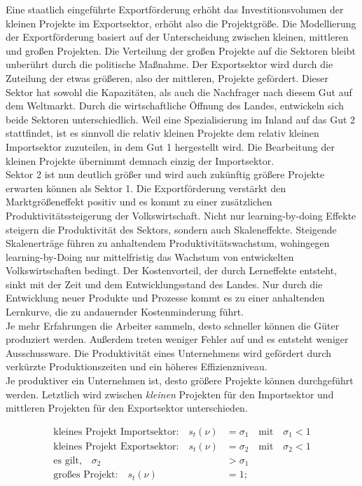 Eine staatlich eingeführte Exportförderung erhöht das Investitionsvolumen der kleinen Projekte im Exportsektor, erhöht also die Projektgröße. Die Modellierung der Exportförderung basiert auf der Unterscheidung zwischen kleinen, mittleren und großen Projekten. Die Verteilung der großen Projekte auf die Sektoren bleibt unberührt durch die politische Maßnahme. Der Exportsektor wird durch die Zuteilung der etwas größeren, also der mittleren, Projekte gefördert.  
Dieser Sektor hat sowohl die Kapazitäten, als auch die Nachfrager nach diesem Gut auf dem Weltmarkt. Durch die wirtschaftliche Öffnung des Landes, entwickeln sich beide Sektoren unterschiedlich. Weil eine Spezialisierung im Inland auf das Gut 2 stattfindet, ist es sinnvoll die relativ kleinen Projekte dem relativ kleinen Importsektor zuzuteilen, in dem Gut 1 hergestellt wird. Die Bearbeitung der kleinen Projekte übernimmt demnach einzig der Importsektor.\\
Sektor 2 ist nun deutlich größer und wird auch zukünftig größere Projekte erwarten können als Sektor 1. Die Exportförderung verstärkt den Marktgrößeneffekt positiv und es kommt zu einer zusätzlichen Produktivitätssteigerung der Volkswirtschaft.  Nicht nur learning-by-doing Effekte steigern die Produktivität des Sektors, sondern auch Skaleneffekte. Steigende Skalenerträge führen zu anhaltendem Produktivitätswachstum, wohingegen learning-by-Doing nur mittelfristig das Wachstum von entwickelten Volkswirtschaften bedingt. Der Kostenvorteil, der durch Lerneffekte entsteht, sinkt mit der Zeit und dem Entwicklungsstand des Landes. Nur durch die Entwicklung neuer Produkte und Prozesse kommt es zu einer anhaltenden Lernkurve, die zu andauernder Kostenminderung führt.\\ 


Je mehr Erfahrungen die Arbeiter sammeln, desto schneller können die Güter produziert werden. Außerdem treten weniger Fehler auf und es entsteht weniger Ausschussware. Die Produktivität eines Unternehmens wird gefördert durch verkürzte  Produktionszeiten und ein höheres Effizienzniveau.\\


Je produktiver ein Unternehmen ist, desto größere Projekte können durchgeführt werden. Letztlich wird zwischen \textit{kleinen} Projekten für den Importsektor und mittleren Projekten für den Exportsektor unterschieden.


	\begin{align*}
		\text{kleines Projekt Importsektor:}\quad s_t(\nu) &= \sigma_1 \quad\text{mit}\quad\sigma_1 < 1\\
		\text{kleines Projekt Exportsektor:} \quad s_t(\nu) &= \sigma_2 \quad\text{mit}\quad\sigma_2 < 1\\
		\text{es gilt,} \quad \sigma_2&>\sigma_1\\
		\text{großes Projekt:} \quad s_t(\nu) &= 1;
	\end{align*}


